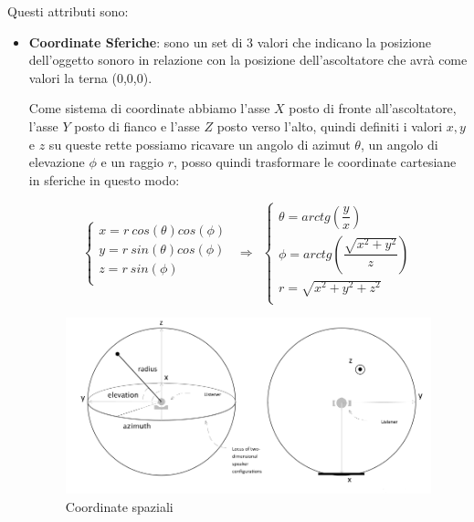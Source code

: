 \documentclass[12pt,a4paper]{report}
\begin{document}
Questi attributi sono:
\begin{itemize}\label{aaa}
\item \textbf{Coordinate Sferiche}: sono un set di 3 valori che indicano la posizione dell'oggetto sonoro in relazione con la posizione dell'ascoltatore che avrà come valori la terna (0,0,0).

Come sistema di coordinate abbiamo l'asse $X$ posto di fronte all'ascoltatore, l'asse $Y$ posto di fianco e l'asse $Z$ posto verso l'alto, quindi definiti i valori $x,y$ e $z$ su queste rette possiamo ricavare un angolo di azimut $\theta$, un angolo di elevazione $\phi$ e un raggio $r$, posso quindi trasformare le coordinate cartesiane in sferiche in questo modo:

\begin{equation}
	\left\{\begin{matrix}
x= r\ cos(\theta) cos(\phi) \\
y= r\ sin(\theta) cos(\phi)\\
z= r\ sin(\phi)\\
\end{matrix}\right. \ \ \Rightarrow \ \  \left\{\begin{matrix}
\theta = arctg \left(\dfrac{y}{x} \right) \\
\phi   = arctg \left(\dfrac{\sqrt{x^2 + y^2 }}{z} \right) \\
r = \sqrt{x^2 +y^2 +z^2 }\\
\end{matrix}\right.
	\label{eq:coordinatepolari}
\end{equation}

\begin{figure}[htbp]
	\centering
	\includegraphics[scale=0.40]{figures/azimut.png}
	\caption {Coordinate spaziali}
	\label{fig:coordinate}
	\end{figure}


\end{itemize}
\end{document}

